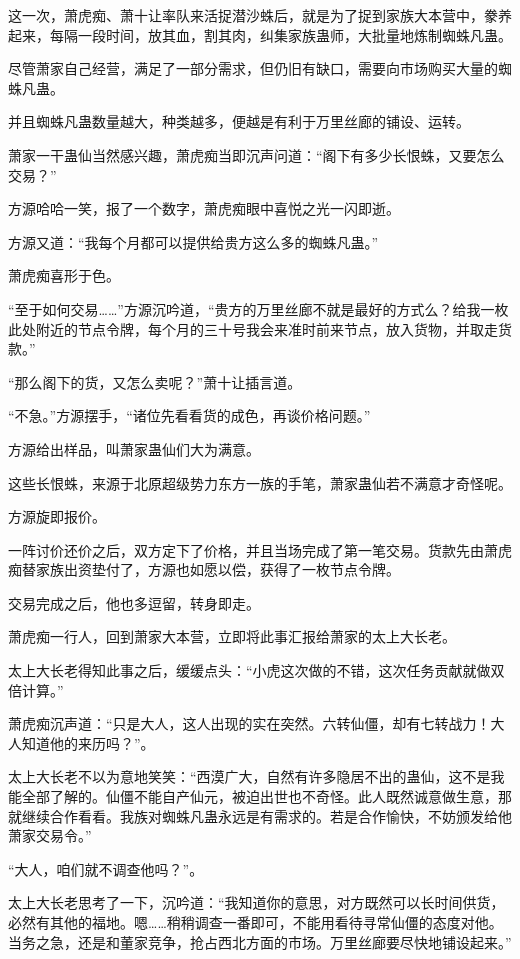 \begin{this_body}
这一次，萧虎痴、萧十让率队来活捉潜沙蛛后，就是为了捉到家族大本营中，豢养起来，每隔一段时间，放其血，割其肉，纠集家族蛊师，大批量地炼制蜘蛛凡蛊。

尽管萧家自己经营，满足了一部分需求，但仍旧有缺口，需要向市场购买大量的蜘蛛凡蛊。

并且蜘蛛凡蛊数量越大，种类越多，便越是有利于万里丝廊的铺设、运转。

萧家一干蛊仙当然感兴趣，萧虎痴当即沉声问道：“阁下有多少长恨蛛，又要怎么交易？”

方源哈哈一笑，报了一个数字，萧虎痴眼中喜悦之光一闪即逝。

方源又道：“我每个月都可以提供给贵方这么多的蜘蛛凡蛊。”

萧虎痴喜形于色。

“至于如何交易……”方源沉吟道，“贵方的万里丝廊不就是最好的方式么？给我一枚此处附近的节点令牌，每个月的三十号我会来准时前来节点，放入货物，并取走货款。”

“那么阁下的货，又怎么卖呢？”萧十让插言道。

“不急。”方源摆手，“诸位先看看货的成色，再谈价格问题。”

方源给出样品，叫萧家蛊仙们大为满意。

这些长恨蛛，来源于北原超级势力东方一族的手笔，萧家蛊仙若不满意才奇怪呢。

方源旋即报价。

一阵讨价还价之后，双方定下了价格，并且当场完成了第一笔交易。货款先由萧虎痴替家族出资垫付了，方源也如愿以偿，获得了一枚节点令牌。

交易完成之后，他也多逗留，转身即走。

萧虎痴一行人，回到萧家大本营，立即将此事汇报给萧家的太上大长老。

太上大长老得知此事之后，缓缓点头：“小虎这次做的不错，这次任务贡献就做双倍计算。”

萧虎痴沉声道：“只是大人，这人出现的实在突然。六转仙僵，却有七转战力！大人知道他的来历吗？”。

太上大长老不以为意地笑笑：“西漠广大，自然有许多隐居不出的蛊仙，这不是我能全部了解的。仙僵不能自产仙元，被迫出世也不奇怪。此人既然诚意做生意，那就继续合作看看。我族对蜘蛛凡蛊永远是有需求的。若是合作愉快，不妨颁发给他萧家交易令。”

“大人，咱们就不调查他吗？”。

太上大长老思考了一下，沉吟道：“我知道你的意思，对方既然可以长时间供货，必然有其他的福地。嗯……稍稍调查一番即可，不能用看待寻常仙僵的态度对他。当务之急，还是和董家竞争，抢占西北方面的市场。万里丝廊要尽快地铺设起来。”


\end{this_body}
